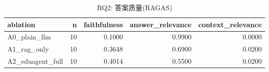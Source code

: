 \begin{table}[t]
\centering
\caption{RQ2: 答案质量(RAGAS)}
\label{tab:rq2}
\begin{tabular}{lrrrr}
\toprule
ablation & n & faithfulness & answer\_relevance & context\_relevance \\
\midrule
A0\_plain\_llm & 10 & 0.1000 & 0.9900 & 0.0000 \\
A1\_rag\_only & 10 & 0.3648 & 0.6900 & 0.0200 \\
A2\_eduagent\_full & 10 & 0.4014 & 0.5500 & 0.0200 \\
\bottomrule
\end{tabular}
\end{table}